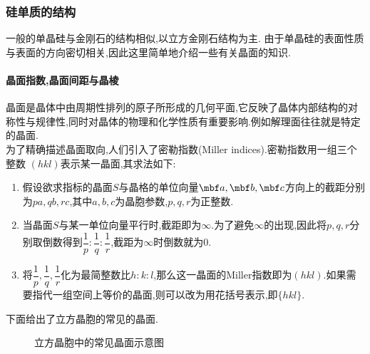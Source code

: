\documentclass{ctexart}
\begin{document}
\subsubsection{硅单质的结构}
一般的单晶硅与金刚石的结构相似,以立方金刚石结构为主.
由于单晶硅的表面性质与表面的方向密切相关,因此这里简单地介绍一些有关晶面的知识.
\paragraph{晶面指数,晶面间距与晶棱}
晶面是晶体中由周期性排列的原子所形成的几何平面,它反映了晶体内部结构的对称性与规律性,同时对晶体的物理和化学性质有重要影响.例如解理面往往就是特定的晶面.\\
\indent 为了精确描述晶面取向,人们引入了密勒指数(Miller indices).密勒指数用一组三个整数 
$(hkl)$表示某一晶面,其求法如下:
\begin{enumerate}[label=$\mathit{Step\ \arabic*.}$,topsep=0pt,parsep=0pt,itemsep=0pt,partopsep=0pt,leftmargin=*]
    \item 假设欲求指标的晶面$S$与晶格的单位向量$\mbf a,\mbf b,\mbf c$方向上的截距分别为$pa,qb,rc$,其中$a,b,c$为晶胞参数,$p,q,r$为正整数.
    \item 当晶面$S$与某一单位向量平行时,截距即为$\infty$.为了避免$\infty$的出现,因此将$p,q,r$分别取倒数得到$\dfrac1p:\dfrac1q:\dfrac1r$,截距为$\infty$时倒数就为$0$.
    \item 将$\dfrac1p,\dfrac1q,\dfrac1r$化为最简整数比$h:k:l$,那么这一晶面的Miller指数即为$(hkl)$.如果需要指代一组空间上等价的晶面,则可以改为用花括号表示,即$\{hkl\}$.
\end{enumerate}
下面给出了立方晶胞的常见的晶面.
\begin{figure}[H]
    \centering
    \caption{立方晶胞中的常见晶面示意图}
\end{figure}
\end{document}
